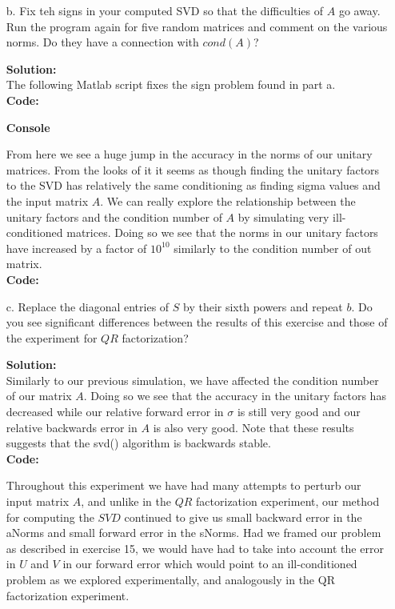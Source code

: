 \documentclass[12pt]{article}
\makeatletter
\theoremstyle{homework}
\newenvironment{exercise}[1]
{\def\@currentlabel{#1}\exercisecore}
{\endexercisecore}
\newcommand{\localhead}[1]{\par\smallskip\noindent\textbf{#1}\nobreak\\}%
\newcommand\solution{\localhead{Solution:}}
\makeatother
\begin{document}
\begin{exercise}{16.2}
\begin{enumerate}
    \item[b.] Fix teh signs in your computed SVD so that the difficulties of $A$ go away. Run the program again for five random matrices and comment on the various 
    norms. Do they have a connection with $cond(A)$?\\
    \solution The following Matlab script fixes the sign problem found in part a. \\
    \textbf{Code:}
    \begin{center}
      
    \end{center} 
    \textbf{Console}
    \begin{center}
      
    \end{center} 
    From here we see a huge jump in the accuracy in the norms of our unitary matrices. From the looks of it it seems as though finding the unitary factors to the SVD has relatively the 
    same conditioning as finding sigma values and the input matrix $A$. We can really explore the relationship between the unitary factors and the condition number of $A$ by simulating very 
    ill-conditioned matrices. Doing so we see that the norms in our unitary factors have increased by a factor of $10^{10}$ similarly to the condition number of out matrix. \\
    \textbf{Code:}
    \begin{center}
      
    \end{center} 

    \vspace{.15in}

    \item[c.] Replace the diagonal entries of $S$ by their sixth powers and repeat $b$. Do you see significant differences between the results of this exercise and those of 
    the experiment for $QR$ factorization?\\
    \solution Similarly to our previous simulation, we have affected the condition number of our matrix $A$. Doing so we see that the accuracy in the unitary factors has decreased while our 
    relative forward error in $\sigma$ is still very good and our relative backwards error in $A$ is also very good. Note that these results suggests that the svd() algorithm is backwards stable.\\
    \textbf{Code:}
    \begin{center}
      
    \end{center} 
    Throughout this experiment we have had many attempts to perturb our input matrix 
    $A$, and unlike in the $QR$ factorization experiment, our method for computing the $SVD$ continued to give us small backward error in the aNorms and small forward error in the sNorms. Had we framed our problem
    as described in exercise 15, we would have had to take into account the error in $U$ and $V$ in our forward error which would point to an ill-conditioned problem as we explored experimentally, and analogously 
    in the QR factorization experiment.
  \end{enumerate}
  
\end{exercise}
\end{document}
